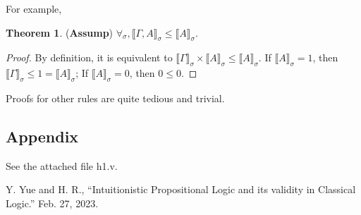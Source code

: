 \documentclass{article}
\theoremstyle{definition}
\newtheorem{theorem}{Theorem}[section]
\newcommand{\brs}[1]{\llbracket#1\rrbracket_\sigma}
\begin{document}
For example,

\begin{theorem}
    (\textbf{Assump}) $\forall_\sigma, \brs{\Gamma, A} \leq \brs{A}$.
\end{theorem}

\begin{proof}
    By definition, it is equivalent to $\brs{\Gamma} \times \brs{A} \leq \brs{A}$.
    If $\brs{A} = 1$, then $\brs{\Gamma}\leq 1 = \brs{A}$;
    If $\brs{A} = 0$, then $0\leq 0$.
\end{proof}

Proofs for other rules are quite tedious and trivial.

\subsection*{Appendix}
See the attached file \textsf{h1.v}.

\begin{thebibliography}{9}
     Y. Yue and H. R., “Intuitionistic Propositional Logic and its validity in Classical Logic.” Feb. 27, 2023.
\end{thebibliography}
\end{document}

